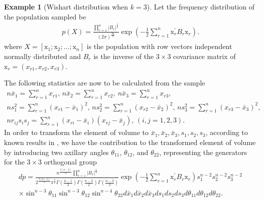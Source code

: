 \documentclass{amsart}
\theoremstyle{definition}
\newtheorem{example}[theorem]{Example}
\numberwithin{equation}{section}
\begin{document}


\begin{example}[Wishart distribution when $k=3$] Let the frequency distribution of the population sampled be
\begin{equation}
    \begin{aligned}
p( X) = \frac{\prod_{r=1}^{n}| B_{r}|^{\frac{1}{2}}}{(2\pi)^{\frac{3n}{2}}} \exp \left(-\frac{1}{2}\sum_{r=1}^{n}\textrm{x}_r^{\prime}  B_{r} \textrm{x}_{r}\right).
\end{aligned}
\label{eq: Wishart density}
\end{equation}
where $ X = [\textrm{x}_1;\textrm{x}_2;\dots;\textrm{x}_n]$ is the population with row vectors independent normally distributed and $ B_{r}$ is the inverse of the $3 \times 3$ covariance matrix of $\textrm{x}_r = (x_{r1},x_{r2},x_{r3})$.


The following statistics are now to be calculated from the sample
$$\begin{aligned}
n \bar{x}_1 = \sum_{r = 1}^nx_{r1}, \,
n \bar{x}_2 =\sum_{r=1}^nx_{r2}, \
n \bar{x}_3 =\sum_{r=1}^nx_{r3}, \\
n s_1^2=\sum_{r=1}^n(x_{r1}-\bar{x}_{1})^2,\, 
n s_2^2=\sum_{r=1}^n(x_{r2}-\bar{x}_{2})^2, \,
n s_3^2=\sum_{r=1}^n(x_{r3}-\bar{x}_{3})^2, \,\\
n r_{ij} s_i s_j=\sum_{r=1}^n(x_{ri}-\bar{x}_{i})(x_{rj}-\bar{x}_{j}), \, (i,j=1,2,3).
\end{aligned}$$
In order to transform the element of volume to $\bar{x}_1,\bar{x}_2,\bar{x}_3,s_{1},s_{2},s_3$, according to known results in \cite{Tumura1965THEDO}, we have the contribution to the transformed element of volume by introducing two axillary angles $\theta_{11}$, $\theta_{12}$, and $\theta_{22}$, representing the generators for the $3\times 3$ orthogonal group
\begin{equation}    \begin{aligned}   dp=    \frac{n^{\frac{3(n-2)}{2}}\prod_{r=1}^{n}| B_{r}|^{\frac{1}{2}}}{2^{\frac{3(n-1)}{2}}\pi^{\frac{3}{2}}\Gamma(\frac{n-1}{2})\Gamma(\frac{n-2}{2})\Gamma(\frac{n-3}{2})} \exp \left(-\frac{1}{2}\sum_{r=1}^{n}\textrm{x}_r^{\prime}  B_{r} \textrm{x}_{r}\right) s_{1}^{n-2}s_{2}^{n-2}s_{3}^{n-2}\\\times \sin^{n-3}\theta_{11}\sin^{n-3}\theta_{12}\sin^{n-4}\theta_{22} d\bar{x}_1d\bar{x}_2d\bar{x}_3ds_{1}ds_{2}ds_{3}d\theta_{11} d\theta_{12}d\theta_{22}.  \end{aligned}\label{eq: multivariate spherical normal in theta12 and phi}\end{equation}


\end{example}
\end{document}
